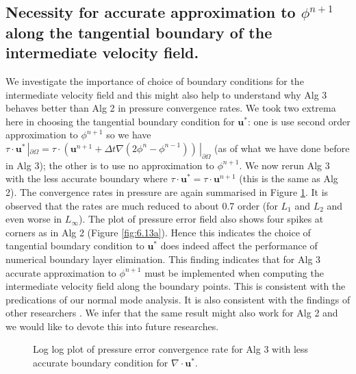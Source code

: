 \subsection*{Necessity for accurate approximation to $\phi^{n+1}$ along the tangential boundary of the intermediate velocity field.}
We investigate the importance of choice of boundary conditions for the intermediate velocity field and this might also help to understand why Alg 3 behaves better than Alg 2 in pressure convergence rates. We took two extrema here in choosing the tangential boundary condition for $\textbf{u}^*$: one is use second order approximation to $\phi^{n+1}$ so we have $\textbf{$\tau$} \cdot \textbf{u}^* \,|_{\partial \Omega} = \textbf{$\tau$} \cdot (\textbf{u}^{n+1} + \Delta t \nabla (2\phi^n - \phi^{n-1}))\,|_{\partial \Omega}$ (as of what we have done before in Alg 3); the other is to use no approximation to $\phi^{n+1}$. We now rerun Alg 3 with the less accurate boundary where $\textbf{$\tau$} \cdot \textbf{u}^* = \textbf{$\tau$} \cdot \textbf{u}^{n+1}$ (this is the same as Alg 2). The convergence rates in pressure are again summarised in Figure \ref{fig:6.12}. It is observed that the rates are much reduced to about 0.7 order (for $L_1$ and $L_2$ and even worse in $L_\infty$). The plot of pressure error field also shows four spikes at corners as in Alg 2 (Figure \ref{fig:6.13a}). Hence this indicates the choice of tangential boundary condition to $\textbf{u}^*$ does indeed affect the performance of numerical boundary layer elimination. This finding indicates that for Alg 3 accurate approximation to $\phi^{n+1}$ must be implemented when computing the intermediate velocity field along the boundary points. This is consistent with the predications of our normal mode analysis. It is also consistent with the findings of other researchers \cite{brown2001accurate}. We infer that the same result might also work for Alg 2 and we would like to devote this into future researches.

\begin{figure}[H]
	\centering
	\caption{Log log plot of pressure error convergence rate for Alg 3 with less accurate boundary condition for $\nabla \cdot \textbf{u}^*$. }\label{fig:6.12}
\end{figure}
	
